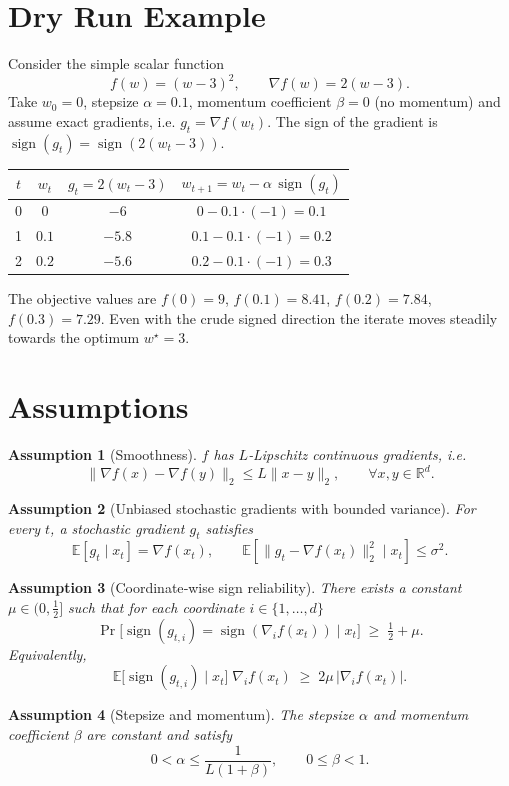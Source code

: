\documentclass{article}
\newtheorem{assumption}{Assumption}
\newcommand{\sign}{\operatorname{sign}}
\newcommand{\E}{\mathbb{E}}
\newcommand{\R}{\mathbb{R}}
\begin{document}
\section*{Dry Run Example}
Consider the simple scalar function
\[
f(w)= (w-3)^2,\qquad \nabla f(w)=2(w-3).
\]
Take $w_0=0$, stepsize $\alpha=0.1$, momentum coefficient $\beta=0$ (no momentum) and assume exact gradients, i.e. $g_t=\nabla f(w_t)$.  
The sign of the gradient is $\sign(g_t)=\sign(2(w_t-3))$.

\begin{center}
\begin{tabular}{c|c|c|c}
$t$ & $w_t$ & $g_t=2(w_t-3)$ & $w_{t+1}=w_t-\alpha\,\sign(g_t)$ \\ \hline
0 & $0$ & $-6$ & $0-0.1\cdot(-1)=0.1$ \\
1 & $0.1$ & $-5.8$ & $0.1-0.1\cdot(-1)=0.2$ \\
2 & $0.2$ & $-5.6$ & $0.2-0.1\cdot(-1)=0.3$ \\
\end{tabular}
\end{center}
The objective values are $f(0)=9$, $f(0.1)=8.41$, $f(0.2)=7.84$, $f(0.3)=7.29$.  
Even with the crude signed direction the iterate moves steadily towards the optimum $w^\star=3$.

\newpage

\section*{Assumptions}
\begin{assumption}[Smoothness]
\label{ass:smooth}
$f$ has $L$‑Lipschitz continuous gradients, i.e.
\[
\|\nabla f(x)-\nabla f(y)\|_2\le L\|x-y\|_2,\qquad\forall x,y\in\R^{d}.
\]
\end{assumption}
\begin{assumption}[Unbiased stochastic gradients with bounded variance]
\label{ass:unbiased}
For every $t$, a stochastic gradient $g_t$ satisfies
\[
\E[g_t\mid x_t]=\nabla f(x_t),\qquad 
\E\!\left[\|g_t-\nabla f(x_t)\|_2^{2}\mid x_t\right]\le\sigma^{2}.
\]
\end{assumption}
\begin{assumption}[Coordinate‑wise sign reliability]
\label{ass:sign}
There exists a constant $\mu\in(0,\tfrac12]$ such that for each coordinate $i\in\{1,\dots,d\}$
\[
\Pr\!\bigl[\sign(g_{t,i})=\sign(\nabla_i f(x_t))\mid x_t\bigr]\;\ge\;\tfrac12+\mu .
\]
Equivalently,
\[
\E\!\bigl[\sign(g_{t,i})\mid x_t\bigr]\;\nabla_i f(x_t)\;\ge\;2\mu\,|\nabla_i f(x_t)|.
\]
\end{assumption}
\begin{assumption}[Stepsize and momentum]
\label{ass:hyper}
The stepsize $\alpha$ and momentum coefficient $\beta$ are constant and satisfy
\[
0<\alpha\le\frac{1}{L(1+\beta)},\qquad 0\le\beta<1 .
\]
\end{assumption}
\end{document}

